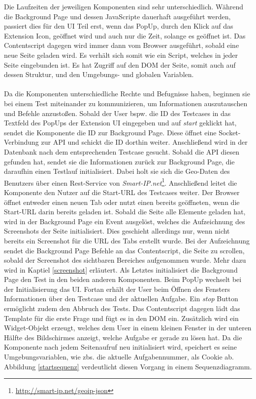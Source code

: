 Die Laufzeiten der jeweiligen Komponenten sind sehr unterschiedlich. Während die Background Page und dessen JavaScripte dauerhaft ausgeführt werden, passiert dies für den UI Teil erst, wenn das PopUp, durch den Klick auf das Extension Icon, geöffnet wird und auch nur die Zeit, solange es geöffnet ist. Das Contentscript dagegen wird immer dann vom Browser ausgeführt, sobald eine neue Seite geladen wird. Es verhält sich somit wie ein Script, welches in jeder Seite eingebunden ist. Es hat Zugriff auf den \Gls{DOM} der Seite, somit auch auf dessen Struktur, und den Umgebungs- und globalen Variablen.\\
\\
Da die Komponenten unterschiedliche Rechte und Befugnisse haben, beginnen sie bei einem Test miteinander zu kommunizieren, um Informationen auszutauschen und Befehle anzustoßen. Sobald der User bspw. die ID des Testcases in das Textfeld des PopUps der Extension UI eingegeben und auf \textit{start} geklickt hat, sendet die Komponente die ID zur Background Page. Diese öffnet eine Socket-Verbindung zur API und schickt die ID dorthin weiter. Anschließend wird in der Datenbank nach dem entsprechenden Testcase gesucht. Sobald die API diesen gefunden hat, sendet sie die Informationen zurück zur Background Page, die daraufhin einen Testlauf initialisiert. Dabei holt sie sich die Geo-Daten des Benutzers über einen Rest-Service von \textit{Smart-IP.net}\footnote{\url{http://smart-ip.net/geoip-json}}. Anschließend leitet die Komponente den Nutzer auf die Start-URL des Testcases weiter. Der Browser öffnet entweder einen neuen Tab oder nutzt einen bereits geöffneten, wenn die Start-URL darin bereits geladen ist. Sobald die Seite alle Elemente geladen hat, wird in der Background Page ein Event ausgelöst, welches die Aufzeichnung des Screenshots der Seite initialisiert. Dies geschieht allerdings nur, wenn nicht bereits ein Screenshot für die URL des Tabs erstellt wurde. Bei der Aufzeichnung sendet die Background Page Befehle an das Contentscript, die Seite zu scrollen, sobald der Screenshot des sichtbaren Bereiches aufgenommen wurde. Mehr dazu wird in Kaptiel \ref{screenshot} erläutert. Als Letztes initialisiert die Background Page den Test in den beiden anderen Komponenten. Beim PopUp wechselt bei der Initialisierung das UI. Fortan erhält der User beim Öffnen des Fensters Informationen über den Testcase und der aktuellen Aufgabe. Ein \textit{stop} Button ermöglicht zudem den Abbruch des Tests. Das Contentscript dagegen lädt das Template für die erste Frage und fügt es in den DOM ein. Zusätzlich wird ein Widget-Objekt erzeugt, welches dem User in einem kleinen Fenster in der unteren Hälfte des Bildschirmes anzeigt, welche Aufgabe er gerade zu lösen hat. Da die Komponente nach jedem Seitenaufruf neu initialisiert wird, speichert es seine Umgebungsvariablen, wie zbs. die aktuelle Aufgabennummer, als Cookie ab. Abbildung \ref{startsequenz} verdeutlicht diesen Vorgang in einem Sequenzdiagramm.

